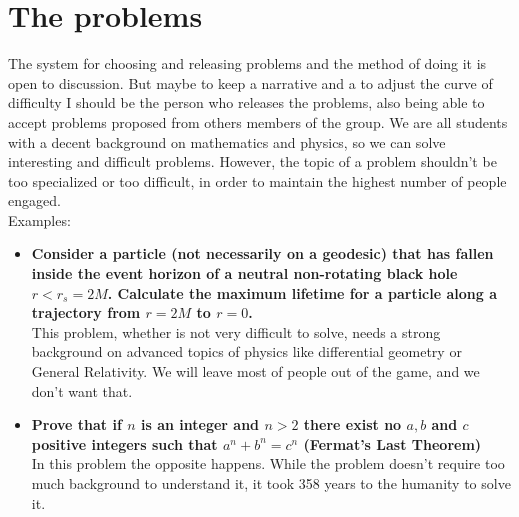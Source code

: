 \documentclass[english,11pt]{article}
\theoremstyle{definition}
\theoremstyle{plain}
\begin{document}
\section*{The problems}
\par The system for choosing and releasing problems and the method of doing it is open to discussion. But maybe to keep a narrative and a to adjust the curve of difficulty I should be the person who releases the problems, also being able to accept problems proposed from others members of the group. We are all students with a decent background on mathematics and physics, so we can solve interesting and difficult problems. However, the topic of a problem shouldn't be too specialized or too difficult, in order to maintain the highest number of people engaged.
\\
Examples:
\begin{itemize}

\item \textbf{Consider a particle (not necessarily on a geodesic) that has fallen inside the event horizon of a neutral non-rotating black hole $r<r_s=2M$. Calculate the maximum lifetime for a particle along a trajectory from $r=2M$ to $r=0$.}
\\ 
This problem, whether is not very difficult to solve, needs a strong background on advanced topics of physics like differential geometry or General Relativity. We will leave most of people out of the game, and we don't want that.

\item \textbf{Prove that if $n$ is an integer and $n>2$ there exist no $a,b$ and $c$ positive integers such that $a^n+b^n=c^n$ (Fermat's Last Theorem)}
\\
In this problem the opposite happens. While the problem doesn't require too much background to understand it, it took 358 years to the humanity to solve it.
\end{itemize}
\end{document}
